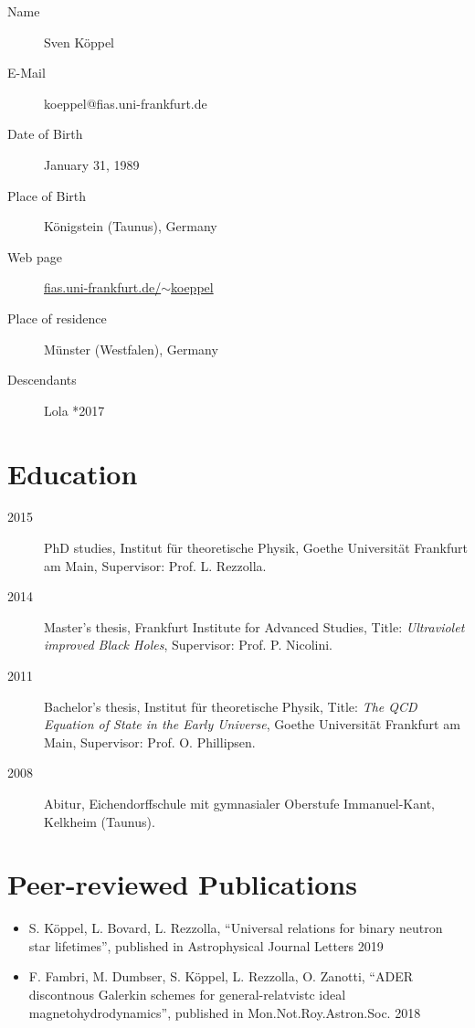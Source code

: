 \begin{fullwidth}
\begin{multicols}{2}
\begin{description}
	\item[Name] Sven Köppel
	\item[E-Mail] koeppel@fias.uni-frankfurt.de
	\item[Date of Birth] January 31, 1989
	\item[Place of Birth] Königstein (Taunus), Germany
	\item[Web page] 
	\href{http://fias.uni-frankfurt.de/~koeppel}{fias.uni-frankfurt.de/{$\sim$}koeppel}
	\item[Place of residence] Münster (Westfalen), Germany
	\item[Descendants] Lola *2017
\end{description}

\section*{Education}
\begin{description}
	\item[2015] PhD studies, Institut für theoretische Physik,
	   Goethe Universität Frankfurt am Main, Supervisor: Prof. L. Rezzolla.
	\item[2014] Master's thesis, Frankfurt Institute for Advanced Studies,
	   Title: \emph{Ultraviolet improved Black Holes},
	   Supervisor: Prof. P. Nicolini.
	\item[2011] Bachelor's thesis, Institut für theoretische Physik,
	   Title: \emph{The QCD Equation of State in the Early Universe},
	   Goethe Universität Frankfurt am Main, Supervisor: Prof. O. Phillipsen.
    \item[2008] Abitur, Eichendorffschule mit gymnasialer Oberstufe
       Immanuel-Kant, Kelkheim (Taunus).
\end{description}

\section*{Peer-reviewed Publications}
\begin{itemize}
	\item
	S. Köppel, L. Bovard, L. Rezzolla,
	``Universal relations for binary neutron star lifetimes'',
	published in Astrophysical Journal Letters 2019 \cite{Koeppel2019}
	
    \item 
    F. Fambri, M. Dumbser, S. Köppel, L. Rezzolla, O. Zanotti,
    ``ADER discontnous Galerkin schemes for general-relatvistc ideal 
    magnetohydrodynamics'',
    published in Mon.Not.Roy.Astron.Soc. 2018 \cite{Fambri2018}
    

\end{itemize}
\end{multicols}
\end{fullwidth}
